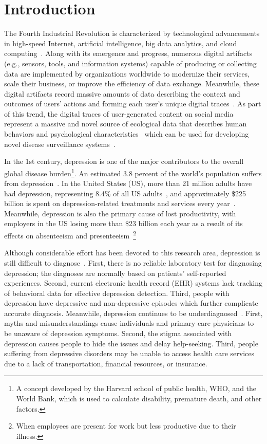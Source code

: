 
\section{Introduction}
\label{sec:intro}

The Fourth Industrial Revolution is characterized by technological advancements in high-speed Internet, artificial intelligence, big data analytics, and cloud computing~\citep{schwab_fourth_2017}. Along with its emergence and progress, numerous digital artifacts (e.g., sensors, tools, and information systems) capable of producing or collecting data are implemented by organizations worldwide to modernize their services, scale their business, or improve the efficiency of data exchange. Meanwhile, these digital artifacts record massive amounts of data describing the context and outcomes of users' actions and forming each user's unique digital traces~. As part of this trend, the digital traces of user-generated content on social media represent a massive and novel source of ecological data that describes human behaviors and psychological characteristics~\citep{foster_managing_2016, settanni_predicting_2018} which can be used for developing novel disease surveillance systems~\citep{wenli_zhang_comprehensive_2020}. 


In the 1st century, depression is one of the major contributors to the overall global disease burden\footnote{A concept developed by the Harvard school of public health, WHO, and the World Bank, which is used to calculate disability, premature death, and other factors.}. An estimated 3.8 percent of the world's population suffers from depression~\citep{who_who_2022}. In the United States (US), more than 21 million adults have had depression, representing 8.4\% of all US adults~\citep{nih_major_2022}, and approximately \$225 billion is spent on depression-related treatments and services every year~\citep{openminds_us_2019}. Meanwhile, depression is also the primary cause of lost productivity, with employers in the US losing more than \$23 billion each year as a result of its effects on absenteeism and presenteeism~\citep{nadeem_identifying_2016}\footnote{When employees are present for work but less productive due to their illness.}


Although considerable effort has been devoted to this research area, depression is still difficult to diagnose~\citep{andrade_epidemiology_2003}. First, there is no reliable laboratory test for diagnosing depression; the diagnoses are normally based on patients' self-reported experiences. Second, current electronic health record (EHR) systems lack tracking of behavioral data for effective depression detection. Third, people with depression have depressive and non-depressive episodes which further complicate accurate diagnosis. Meanwhile, depression continues to be underdiagnosed~\citep{prince_no_2007}. First, myths and misunderstandings cause individuals and primary care physicians to be unaware of depression symptoms. Second, the stigma associated with depression causes people to hide the issues and delay help-seeking. Third, people suffering from depressive disorders may be unable to access health care services due to a lack of transportation, financial resources, or insurance.

